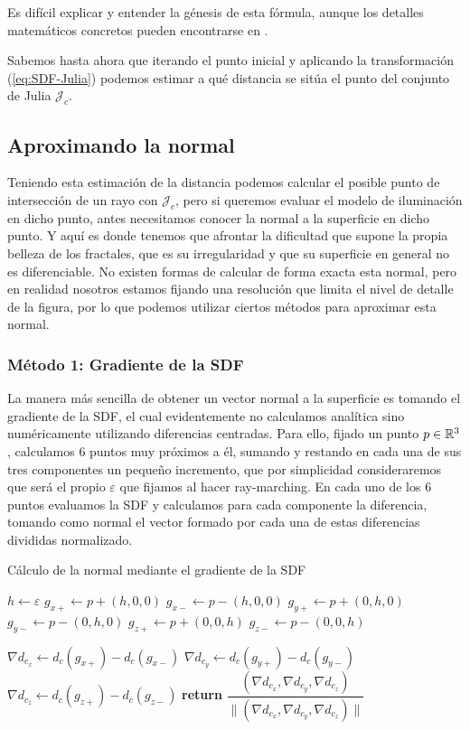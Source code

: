 Es difícil explicar y entender la génesis de esta fórmula, aunque los detalles matemáticos concretos pueden encontrarse en \cite[Capítulo 8]{Hubbard-Douady}. 

Sabemos hasta ahora que iterando el punto inicial y aplicando la transformación (\ref{eq:SDF-Julia}) podemos estimar a qué distancia se sitúa el punto del conjunto de Julia $\mathcal{J}_c$.

\subsection{Aproximando la normal}
\label{subsection:normal-sdf}

Teniendo esta estimación de la distancia podemos calcular el posible punto de intersección de un rayo con $\mathcal{J}_c$, pero si queremos evaluar el modelo de iluminación en dicho punto, antes necesitamos conocer la normal a la superficie en dicho punto. Y aquí es donde tenemos que afrontar la dificultad que supone la propia belleza de los fractales, que es su irregularidad y que su superficie en general no es diferenciable. No existen formas de calcular de forma exacta esta normal, pero en realidad nosotros estamos fijando una resolución que limita el nivel de detalle de la figura, por lo que podemos utilizar ciertos métodos para aproximar esta normal.

\subsubsection{Método 1: Gradiente de la SDF}

La manera más sencilla de obtener un vector normal a la superficie es tomando el gradiente de la SDF, el cual evidentemente no calculamos analítica sino numéricamente utilizando diferencias centradas. Para ello, fijado un punto $p\in\mathbb{R}^3$, calculamos 6 puntos muy próximos a él, sumando y restando en cada una de sus tres componentes un pequeño incremento, que por simplicidad consideraremos que será el propio $\varepsilon$ que fijamos al hacer ray-marching. En cada uno de los 6 puntos evaluamos la SDF y calculamos para cada componente la diferencia, tomando como normal el vector formado por cada una de estas diferencias divididas normalizado.

\begin{algorithm}[H]
    \caption{Cálculo de la normal mediante el gradiente de la SDF} \label{alg:normal-gradiente-sdf}
    \begin{algorithmic}
    \State $h\gets\varepsilon$
    \State $g_{x+}\gets p + (h,0,0)$
    \State $g_{x-}\gets p - (h,0,0)$
    \State $g_{y+}\gets p + (0,h,0)$
    \State $g_{y-}\gets p - (0,h,0)$
    \State $g_{z+}\gets p + (0,0,h)$
    \State $g_{z-}\gets p - (0,0,h)$

    \State $\nabla d_{c_x} \gets d_c(g_{x+})-d_c(g_{x-})$
    \State $\nabla d_{c_y} \gets d_c(g_{y+})-d_c(g_{y-})$
    \State $\nabla d_{c_z} \gets d_c(g_{z+})-d_c(g_{z-})$
        \State \textbf{return} $\dfrac{(\nabla d_{c_x},\nabla d_{c_y},\nabla d_{c_z})}{\|(\nabla d_{c_x},\nabla d_{c_y},\nabla d_{c_z})\|}$
    \end{algorithmic}
\end{algorithm}

